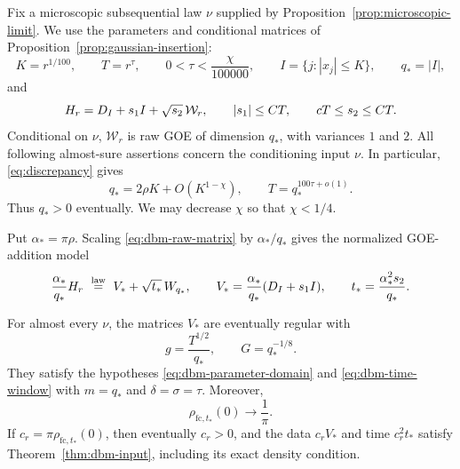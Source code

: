Fix a microscopic subsequential law \(\nu\) supplied by
Proposition~\ref{prop:microscopic-limit}. We use the parameters and
conditional matrices of Proposition~\ref{prop:gaussian-insertion}:
\[
 K=r^{1/100},\qquad T=r^\tau,\qquad
 0<\tau<\frac{\chi}{100000},\qquad
 I=\{j:|x_j|\le K\},\qquad q_*=|I|,
\]
and
\begin{equation}
 \label{eq:dbm-raw-matrix}
 H_r=D_I+s_1I+\sqrt{s_2}\,\mathcal W_r,
 \qquad |s_1|\le C T,\qquad cT\le s_2\le CT.
\end{equation}
Conditional on \(\nu\), \(\mathcal W_r\) is raw GOE of dimension
\(q_*\), with variances \(1\) and \(2\). All following almost-sure
assertions concern the conditioning input \(\nu\). In particular,
\eqref{eq:discrepancy} gives
\begin{equation}
 \label{eq:dbm-dimension}
 q_*=2\rho K+O(K^{1-\chi}),
 \qquad
 T=q_*^{100\tau+o(1)}.
\end{equation}
Thus \(q_*>0\) eventually. We may decrease \(\chi\) so that
\(\chi<1/4\).

Put \(\alpha_*=\pi\rho\). Scaling \eqref{eq:dbm-raw-matrix} by
\(\alpha_*/q_*\) gives the normalized GOE-addition model
\begin{equation}
 \label{eq:dbm-normalized-matrix}
 \frac{\alpha_*}{q_*}H_r
   \ \stackrel{\mathrm{law}}{=}\
       V_*+\sqrt{t_*}\,W_{q_*},
 \qquad
 V_*=\frac{\alpha_*}{q_*}(D_I+s_1I),
 \qquad
 t_*=\frac{\alpha_*^2s_2}{q_*}.
\end{equation}

\begin{lemma}
\label{dbm:regularity-density}
For almost every \(\nu\), the matrices \(V_*\) are eventually regular
with
\[
 g=\frac{T^{1/2}}{q_*},\qquad G=q_*^{-1/8}.
\]
They satisfy the hypotheses
\eqref{eq:dbm-parameter-domain} and \eqref{eq:dbm-time-window} with
\(m=q_*\) and \(\delta=\sigma=\tau\). Moreover,
\[
 \rho_{\mathrm{fc},t_*}(0)\longrightarrow\frac1\pi.
\]
If \(c_r=\pi\rho_{\mathrm{fc},t_*}(0)\), then eventually \(c_r>0\),
and the data \(c_rV_*\) and time \(c_r^2t_*\) satisfy
Theorem~\ref{thm:dbm-input}, including its exact density condition.
\end{lemma}

